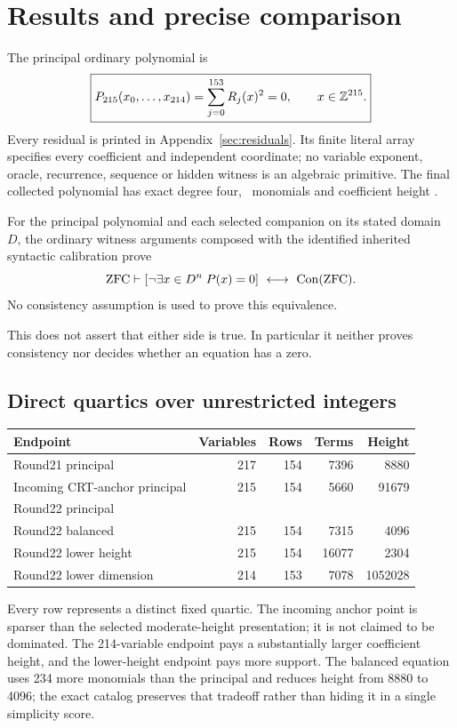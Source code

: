 \section{Results and precise comparison}
\label{sec:results}

The principal ordinary polynomial is
\begin{equation}\label{eq:principal}
 \boxed{P_{215}(x_0,\ldots,x_{214})
       =\sum_{j=0}^{153}R_j(x)^2=0,
       \qquad x\in\mathbb Z^{215}.}
\end{equation}
Every residual is printed in Appendix~\ref{sec:residuals}. Its finite
literal array specifies every coefficient and independent coordinate;
no variable exponent, oracle, recurrence, sequence or hidden witness
is an algebraic primitive. The final collected polynomial has exact
degree four, \PrincipalTerms\ monomials and coefficient height
\PrincipalHeight.

\begin{theorem}\label{thm:main}
For the principal polynomial and each selected companion on its stated
domain $D$, the ordinary witness arguments composed with the identified
inherited syntactic calibration prove
\[
 \mathrm{ZFC}\vdash
 [\neg\exists x\in D^n\;P(x)=0]\ \longleftrightarrow\
 \operatorname{Con}(\mathrm{ZFC}).
\]
No consistency assumption is used to prove this equivalence.
\end{theorem}
This does not assert that either side is true. In particular it neither
proves consistency nor decides whether an equation has a zero.

\subsection{Direct quartics over unrestricted integers}
\begin{center}\small
\begin{tabular}{@{}lrrrr@{}}\toprule
Endpoint & Variables & Rows & Terms & Height\\\midrule
Round21 principal &217&154&7396&8880\\
Incoming CRT-anchor principal &215&154&5660&91679\\
Round22 principal &\PrincipalVariables&\PrincipalRows&\PrincipalTerms&\PrincipalHeight\\
Round22 balanced &215&154&7315&4096\\
Round22 lower height &215&154&16077&2304\\
Round22 lower dimension &214&153&7078&1052028\\\bottomrule
\end{tabular}
\end{center}
Every row represents a distinct fixed quartic. The incoming anchor point
is sparser than the selected moderate-height presentation; it is not
claimed to be dominated. The 214-variable endpoint pays a substantially
larger coefficient height, and the lower-height endpoint pays more
support. The balanced equation uses 234 more monomials than the principal
and reduces height from 8880 to 4096; the exact catalog preserves that
tradeoff rather than hiding it in a single simplicity score.

